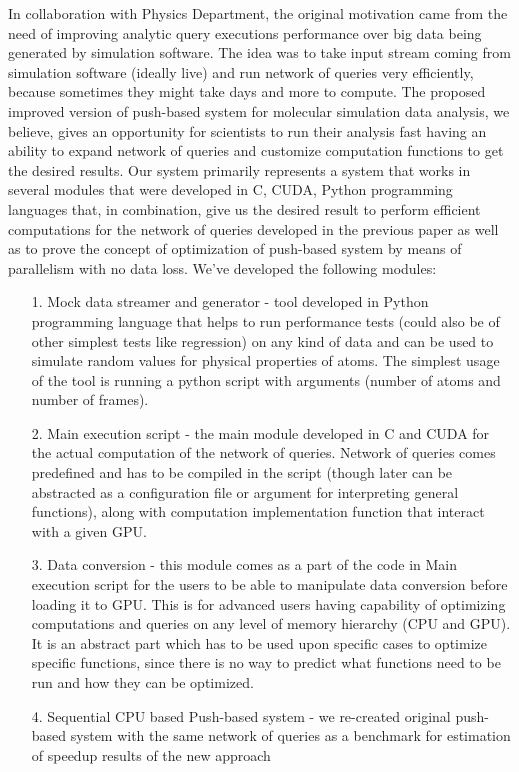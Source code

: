 \documentclass[12pt,letterpaper]{report}
\begin{document}
\hspace{3em} In collaboration with Physics Department, the original motivation came from the need of improving analytic query executions performance over big data being generated by simulation software. The idea was to take input stream coming from simulation software (ideally live) and run network of queries very efficiently, because sometimes they might take days and more to compute. The proposed improved version of push-based system for molecular simulation data analysis, we believe, gives an opportunity for scientists to run their analysis fast having an ability to expand network of queries and customize computation functions to get the desired results. 
Our system primarily represents a system that works in several modules that were developed in C, CUDA, Python programming languages that, in combination, give us the desired result to perform efficient computations for the network of queries developed in the previous paper \cite{mainPaper} as well as to prove the concept of optimization of push-based system by means of parallelism with no data loss. We've developed the following modules:

\begin{itemize}
\item[1.] Mock data streamer and generator - tool developed in Python programming language that helps to run performance tests (could also be of other simplest tests like regression) on any kind of data and can be used to simulate random values for physical properties of atoms. The simplest usage of the tool is running a python script with arguments (number of atoms and number of frames).
\item[2.] Main execution script - the main module developed in C and CUDA for the actual computation of the network of queries. Network of queries comes predefined and has to be compiled in the script (though later can be abstracted as a configuration file or argument for interpreting general functions), along with computation implementation function that interact with a given GPU.
\item[3.] Data conversion - this module comes as a part of the code in Main execution script for the users to be able to manipulate data conversion before loading it to GPU. This is for advanced users having capability of optimizing computations and queries on any level of memory hierarchy (CPU and GPU). It is an abstract part which has to be used upon specific cases to optimize specific functions, since there is no way to predict what functions need to be run and how they can be optimized.
\item[4.] Sequential CPU based Push-based system - we re-created original push-based system with the same network of queries as a benchmark for estimation of speedup results of the new approach

\end{itemize}
\end{document}
